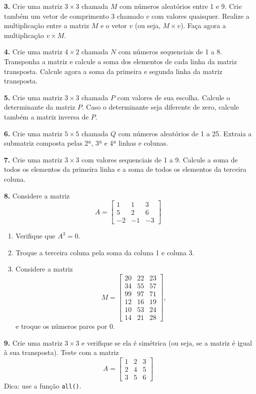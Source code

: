 \documentclass[
]{book}
\begin{document}
\textbf{3.} Crie uma matriz \(3 \times 3\) chamada \(M\) com números aleatórios
entre 1 e 9. Crie também um vetor de comprimento 3 chamado \(v\) com valores quaisquer. Realize a multiplicação entre a matriz \(M\) e o vetor \(v\) (ou seja,
\(M \times v\)). Faça agora a multiplicação \(v \times M\).

\textbf{4.} Crie uma matriz \(4 \times 2\) chamada \(N\) com números sequenciais
de 1 a 8. Transponha a matriz e calcule a soma dos elementos de cada
linha da matriz transposta. Calcule agora a soma da primeira e segunda
linha da matriz transposta.

\textbf{5.} Crie uma matriz \(3 \times 3\) chamada \(P\) com valores de sua
escolha. Calcule o determinante da matriz \(P\). Caso o determinante seja
diferente de zero, calcule também a matriz inversa de \(P\).

\textbf{6.} Crie uma matriz \(5 \times 5\) chamada \(Q\) com números aleatórios
de 1 a 25. Extraia a submatriz composta pelas 2ª, 3ª e 4ª linhas e
colunas.

\textbf{7.} Crie uma matriz \(3 \times 3\) com valores sequenciais de 1 a 9.
Calcule a soma de todos os elementos da primeira linha e a soma de todos
os elementos da terceira coluna.

\textbf{8.} Considere a matriz \[A = \left[
\begin{matrix}
    1 & 1 & 3 \\
    5 & 2 & 6 \\
    -2 & -1 & -3
\end{matrix}
\right]\]

\begin{enumerate}
\def\labelenumi{(\alph{enumi})}
\item
  Verifique que \(A^3=0\).
\item
  Troque a terceira coluna pela soma da coluna 1 e coluna 3.
\item
  Considere a matriz \[
  M = \left[
  \begin{matrix}
  20 & 22 & 23 \\
  34 & 55 & 57 \\
  99 & 97 & 71 \\
  12 & 16 & 19 \\
  10 & 53 & 24 \\
  14 & 21 & 28
  \end{matrix}
  \right],
  \] e troque os números pares por 0.
\end{enumerate}

\textbf{9.} Crie uma matriz \(3\times 3\) e verifique se ela é simétrica (ou
seja, se a matriz é igual à sua transposta). Teste com a matriz \[A = 
\left[ \begin{matrix}
1 & 2 & 3 \\
2 & 4 & 5 \\
3 & 5 & 6
\end{matrix}\right]\] Dica: use a função \texttt{all()}.
\end{document}
